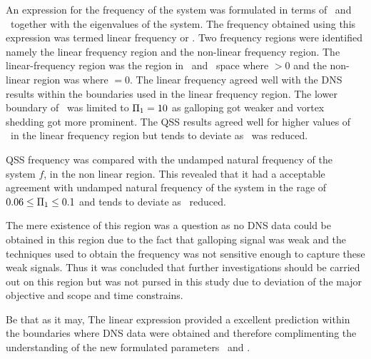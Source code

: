 An expression for the frequency of the system was formulated in terms of \massstiff\ and \massdamp\ together with the eigenvalues of the system. The frequency obtained using this expression was termed linear frequency or \freqlin. Two frequency regions were identified namely the linear frequency region and the non-linear frequency region. The linear-frequency region was the region in \massstiff\ and \massdamp\ space where \freqlin$>0$ and the non-linear region was where \freqlin$=0$. The linear frequency agreed well with the DNS results within the boundaries used in the linear frequency region. The lower boundary of \massstiff\ was limited to $\Pi_1=10$ as galloping got weaker and vortex shedding got more prominent. The QSS results agreed well for higher values of \massstiff\ in the linear frequency region but tends to deviate as \massstiff\ was reduced. 

QSS frequency was compared with the undamped natural frequency of the system $f$, in the non linear region. This revealed that it had a acceptable agreement with undamped natural frequency of the system in the rage of $0.06\leq\Pi_1\leq0.1$ and tends to deviate as \massstiff\ reduced. 

The mere existence of this region was a question as no DNS data could be obtained in this region due to the fact that galloping signal was weak and the techniques used to obtain the  frequency was not sensitive enough to capture these weak signals. Thus it was concluded that further investigations should be carried out on this region but was not pursed in this study due to deviation of the major objective and scope and time constrains.

Be that as it may, The linear expression provided a excellent prediction within the boundaries where DNS data were obtained and therefore complimenting the understanding of the new formulated parameters \massstiff\ and \massdamp.    



